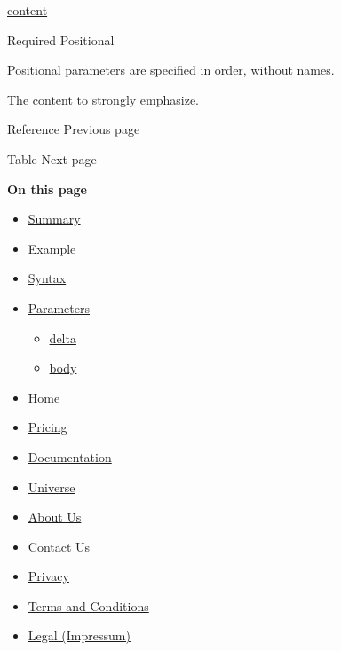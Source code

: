 \href{/docs/reference/foundations/content/}{content}

{Required} {{ Positional }}

\label{parameters-body-positional-tooltip}
Positional parameters are specified in order, without names.

The content to strongly emphasize.

\href{/docs/reference/model/ref/}{\pandocbounded{}}

{ Reference } { Previous page }

\href{/docs/reference/model/table/}{\pandocbounded{}}

{ Table } { Next page }

\textbf{On this page}

\begin{itemize}
\tightlist
\item
  \hyperref[summary]{Summary}
\item
  \hyperref[example]{Example}
\item
  \hyperref[syntax]{Syntax}
\item
  \hyperref[parameters]{Parameters}

  \begin{itemize}
  \tightlist
  \item
    \hyperref[parameters-delta]{delta}
  \item
    \hyperref[parameters-body]{body}
  \end{itemize}
\end{itemize}

\begin{itemize}
\tightlist
\item
  \href{/}{Home}
\item
  \href{/pricing/}{Pricing}
\item
  \href{/docs/}{Documentation}
\item
  \href{/universe/}{Universe}
\item
  \href{/about/}{About Us}
\item
  \href{/contact/}{Contact Us}
\item
  \href{/privacy/}{Privacy}
\item
  \href{https://typst.app/terms}{Terms and Conditions}
\item
  \href{/legal/}{Legal (Impressum)}
\end{itemize}

